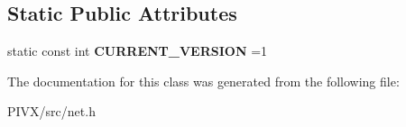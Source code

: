 \subsection*{Static Public Attributes}
\begin{DoxyCompactItemize}
\item 
\mbox{\label{class_c_ban_entry_a5cea0be04742cec8903b4f3a558bcdf9}} 
static const int {\bfseries C\+U\+R\+R\+E\+N\+T\+\_\+\+V\+E\+R\+S\+I\+ON} =1
\end{DoxyCompactItemize}


The documentation for this class was generated from the following file\+:\begin{DoxyCompactItemize}
\item 
P\+I\+V\+X/src/net.\+h\end{DoxyCompactItemize}
